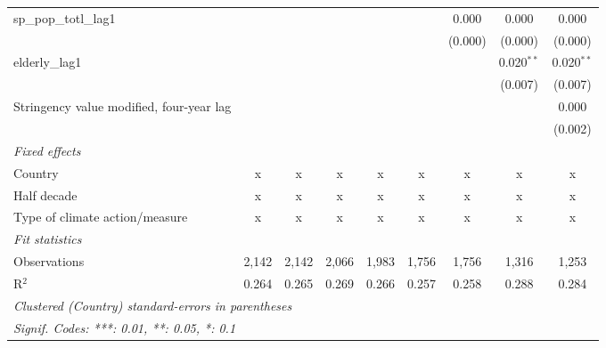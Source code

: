\begin{tabular}{lcccccccc}
   sp\_pop\_totl\_lag1                            &               &               &               &               &         & 0.000   & 0.000        & 0.000\\   
                                                  &               &               &               &               &         & (0.000) & (0.000)      & (0.000)\\   
   elderly\_lag1                                  &               &               &               &               &         &         & 0.020$^{**}$ & 0.020$^{**}$\\   
                                                  &               &               &               &               &         &         & (0.007)      & (0.007)\\   
   Stringency value modified, four-year lag       &               &               &               &               &         &         &              & 0.000\\   
                                                  &               &               &               &               &         &         &              & (0.002)\\   
   \emph{Fixed effects}\\
   Country                                        & x             & x             & x             & x             & x       & x       & x            & x\\  
   Half decade                                    & x             & x             & x             & x             & x       & x       & x            & x\\  
   Type of climate action/measure                 & x             & x             & x             & x             & x       & x       & x            & x\\  
   \midrule \emph{Fit statistics}\\
   Observations                                   & 2,142         & 2,142         & 2,066         & 1,983         & 1,756   & 1,756   & 1,316        & 1,253\\  
   R$^2$                                          & 0.264         & 0.265         & 0.269         & 0.266         & 0.257   & 0.258   & 0.288        & 0.284\\  
   \midrule
   \multicolumn{9}{l}{\emph{Clustered (Country) standard-errors in parentheses}}\\
   \multicolumn{9}{l}{\emph{Signif. Codes: ***: 0.01, **: 0.05, *: 0.1}}\\
\end{tabular}
\par\endgroup


